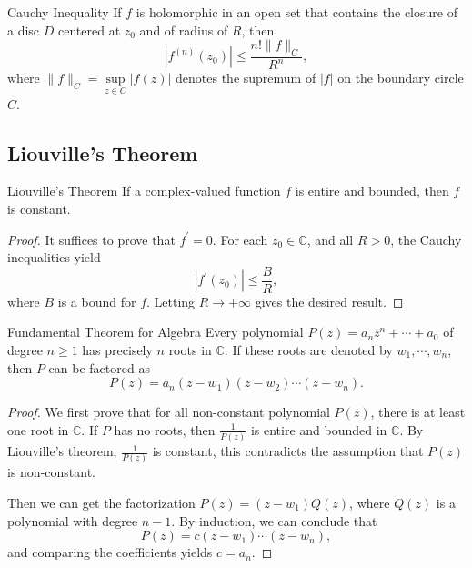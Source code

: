 \begin{solution}
  
\end{solution}

\begin{corollary}{Cauchy Inequality}{}
  If $f$ is holomorphic in an open set that contains the closure of a disc $D$
  centered at $z_0$ and of radius of $R$, then
  \begin{equation}
    |f^{(n)}(z_0)| \leq \frac{n! \|f\|_C}{R^n},
  \end{equation}
  where $\|f\|_C = \sup \limits_{z \in C}|f(z)|$ denotes the supremum of $|f|$
  on the boundary circle $C$.
\end{corollary}

\subsection{Liouville's Theorem}

\begin{theorem}{Liouville's Theorem}{}
  If a complex-valued function $f$ is entire and bounded, then $f$ is constant.
\end{theorem}

\begin{proof}
  It suffices to prove that $f^{\prime} = 0$.
  For each $z_0 \in \mathbb{C}$, and all $R > 0$, the Cauchy inequalities yield
  \begin{equation}
    |f^{\prime}(z_0)| \leq \frac{B}{R},
  \end{equation}
  where $B$ is a bound for $f$. Letting $R \rightarrow +\infty$ gives the desired result.
\end{proof}

\begin{theorem}{Fundamental Theorem for Algebra}{}
  Every polynomial $P(z) = a_nz^n + \cdots + a_0$ of degree $n \geq 1$
  has precisely $n$ roots in $\mathbb{C}$.
  If these roots are denoted by $w_1,\cdots,w_n$, then $P$ can be factored as
  \begin{equation}
    P(z) = a_n(z-w_1)(z-w_2)\cdots (z-w_n).
  \end{equation}
\end{theorem}

\begin{proof}
  We first prove that for all non-constant polynomial $P(z)$,
  there is at least one root in $\mathbb{C}$.
  If $P$ has no roots, then $\frac{1}{P(z)}$ is entire and bounded in $\mathbb{C}$.
  By Liouville's theorem, $\frac{1}{P(z)}$ is constant,
  this contradicts the assumption that $P(z)$ is non-constant.

  Then we can get the factorization $P(z) = (z-w_1)Q(z)$,
  where $Q(z)$ is a polynomial with degree $n-1$.
  By induction, we can conclude that
  \begin{equation}
    P(z) = c(z-w_1)\cdots (z-w_n),
  \end{equation}
  and comparing the coefficients yields $c = a_n$.
\end{proof}


